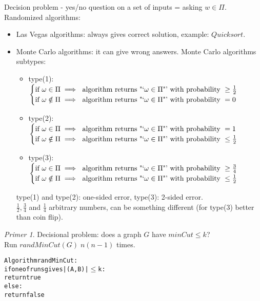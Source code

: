 \documentclass[a4paper, 12pt]{book}
\theoremstyle{definition}
\theoremstyle{remark}
\newtheorem*{ex}{Primer}
\begin{document}
Decision problem - yes/no question on a set of inputs = asking $w \in \Pi$. \\
Randomized algorithms:
\begin{itemize}
  \item Las Vegas algorithms: always gives correct solution, example: $Quicksort$.
  \item Monte Carlo algorithms: it can give wrong answers.
    Monte Carlo algorithms subtypes:
    \begin{itemize}
      \item type(1): $\begin{cases}
          \text{if } \omega \in \Pi \implies \text{ algorithm returns "`$\omega \in \Pi$"' with probability } \geq \frac{1}{2} \\ 
          \text{if } \omega \notin \Pi \implies \text{ algorithm returns "`$\omega \in \Pi$"' with probability } = 0 
        \end{cases}$
      \item type(2): $\begin{cases}
          \text{if } \omega \in \Pi \implies \text{ algorithm returns "`$\omega \in \Pi$"' with probability } = 1 \\ 
          \text{if } \omega \notin \Pi \implies \text{ algorithm returns "`$\omega \in \Pi$"' with probability } \leq \frac{1}{2} 
        \end{cases}$
      \item type(3): $\begin{cases}
          \text{if } \omega \in \Pi \implies \text{ algorithm returns "`$\omega \in \Pi$"' with probability } \geq \frac{3}{4} \\ 
          \text{if } \omega \notin \Pi \implies \text{ algorithm returns "`$\omega \in \Pi$"' with probability } \leq \frac{1}{2}
        \end{cases}$
    \end{itemize}
    type(1) and type(2): one-sided error, type(3): 2-sided error. \\
    $\frac{1}{2}, \frac{3}{4}$ and $\frac{1}{4}$ arbitrary numbers, can be something different (for type(3) better than coin flip).
\end{itemize}
\begin{ex}
  Decisional problem: does a graph $G$ have $minCut \leq k$? \\
  Run $randMinCut(G) \; n(n-1)$ times.
  \begin{alltt}
    Algorithm randMinCut:
      if one of runs gives |(A,B)| \(\leq\) k:
        return true
      else:
        return false
  \end{alltt}
\end{ex}
\end{document}
